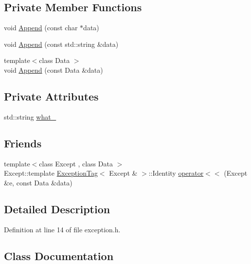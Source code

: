 \subsection*{Private Member Functions}
\begin{DoxyCompactItemize}
\item 
void \hyperlink{classamunmt_1_1util_1_1Exception_a85a0b4c849d6511fc6211cdac5d0f964}{Append} (const char $\ast$data)
\item 
void \hyperlink{classamunmt_1_1util_1_1Exception_a4319d1256d395e242b519814a2cb1da1}{Append} (const std\+::string \&data)
\item 
{\footnotesize template$<$class Data $>$ }\\void \hyperlink{classamunmt_1_1util_1_1Exception_a2e736d7729fc9ae34da5611e5854d94b}{Append} (const Data \&data)
\end{DoxyCompactItemize}
\subsection*{Private Attributes}
\begin{DoxyCompactItemize}
\item 
std\+::string \hyperlink{classamunmt_1_1util_1_1Exception_a33c467c532b9023837208ab9138f23d8}{what\+\_\+}
\end{DoxyCompactItemize}
\subsection*{Friends}
\begin{DoxyCompactItemize}
\item 
{\footnotesize template$<$class Except , class Data $>$ }\\Except\+::template \hyperlink{classamunmt_1_1util_1_1Exception_dd/dc0/structamunmt_1_1util_1_1Exception_1_1ExceptionTag}{Exception\+Tag}$<$ Except \& $>$\+::Identity \hyperlink{classamunmt_1_1util_1_1Exception_ab21ac50ac597b4aafb46ebfce48e2739}{operator$<$$<$} (Except \&e, const Data \&data)
\end{DoxyCompactItemize}


\subsection{Detailed Description}


Definition at line 14 of file exception.\+h.



\subsection{Class Documentation}
\label{structamunmt_1_1util_1_1Exception_1_1ExceptionTag}
\hypertarget{classamunmt_1_1util_1_1Exception_structamunmt_1_1util_1_1Exception_1_1ExceptionTag}{}
